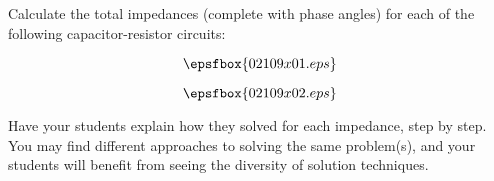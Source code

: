 

Calculate the total impedances (complete with phase angles) for each of the following capacitor-resistor circuits:

$$\epsfbox{02109x01.eps}$$







$$\epsfbox{02109x02.eps}$$







Have your students explain how they solved for each impedance, step by step.  You may find different approaches to solving the same problem(s), and your students will benefit from seeing the diversity of solution techniques.




